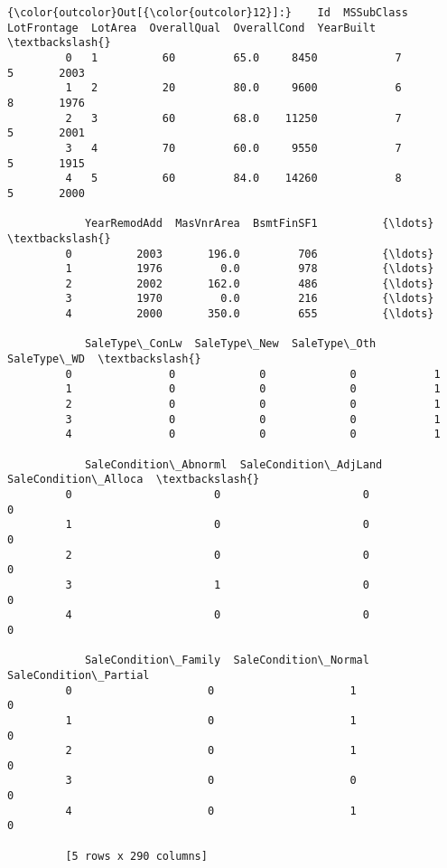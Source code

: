 \documentclass[11pt]{article}
\begin{document}
\begin{Verbatim}[commandchars=\\\{\}]
{\color{outcolor}Out[{\color{outcolor}12}]:}    Id  MSSubClass  LotFrontage  LotArea  OverallQual  OverallCond  YearBuilt  \textbackslash{}
         0   1          60         65.0     8450            7            5       2003   
         1   2          20         80.0     9600            6            8       1976   
         2   3          60         68.0    11250            7            5       2001   
         3   4          70         60.0     9550            7            5       1915   
         4   5          60         84.0    14260            8            5       2000   
         
            YearRemodAdd  MasVnrArea  BsmtFinSF1          {\ldots}            \textbackslash{}
         0          2003       196.0         706          {\ldots}             
         1          1976         0.0         978          {\ldots}             
         2          2002       162.0         486          {\ldots}             
         3          1970         0.0         216          {\ldots}             
         4          2000       350.0         655          {\ldots}             
         
            SaleType\_ConLw  SaleType\_New  SaleType\_Oth  SaleType\_WD  \textbackslash{}
         0               0             0             0            1   
         1               0             0             0            1   
         2               0             0             0            1   
         3               0             0             0            1   
         4               0             0             0            1   
         
            SaleCondition\_Abnorml  SaleCondition\_AdjLand  SaleCondition\_Alloca  \textbackslash{}
         0                      0                      0                     0   
         1                      0                      0                     0   
         2                      0                      0                     0   
         3                      1                      0                     0   
         4                      0                      0                     0   
         
            SaleCondition\_Family  SaleCondition\_Normal  SaleCondition\_Partial  
         0                     0                     1                      0  
         1                     0                     1                      0  
         2                     0                     1                      0  
         3                     0                     0                      0  
         4                     0                     1                      0  
         
         [5 rows x 290 columns]
\end{Verbatim}
            
\end{document}
